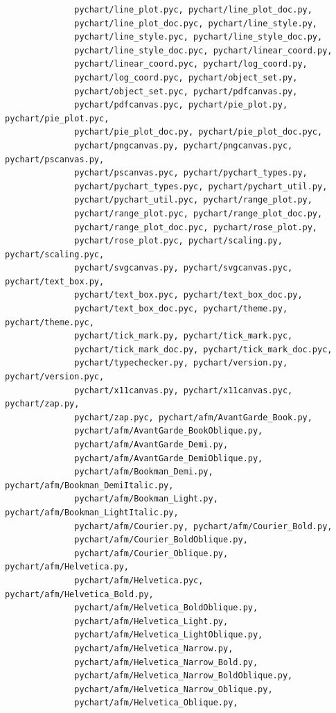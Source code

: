 \documentclass[a4paper]{article}
\begin{document}
\begin{verbatim}
              pychart/line_plot.pyc, pychart/line_plot_doc.py,
              pychart/line_plot_doc.pyc, pychart/line_style.py,
              pychart/line_style.pyc, pychart/line_style_doc.py,
              pychart/line_style_doc.pyc, pychart/linear_coord.py,
              pychart/linear_coord.pyc, pychart/log_coord.py,
              pychart/log_coord.pyc, pychart/object_set.py,
              pychart/object_set.pyc, pychart/pdfcanvas.py,
              pychart/pdfcanvas.pyc, pychart/pie_plot.py, pychart/pie_plot.pyc,
              pychart/pie_plot_doc.py, pychart/pie_plot_doc.pyc,
              pychart/pngcanvas.py, pychart/pngcanvas.pyc, pychart/pscanvas.py,
              pychart/pscanvas.pyc, pychart/pychart_types.py,
              pychart/pychart_types.pyc, pychart/pychart_util.py,
              pychart/pychart_util.pyc, pychart/range_plot.py,
              pychart/range_plot.pyc, pychart/range_plot_doc.py,
              pychart/range_plot_doc.pyc, pychart/rose_plot.py,
              pychart/rose_plot.pyc, pychart/scaling.py, pychart/scaling.pyc,
              pychart/svgcanvas.py, pychart/svgcanvas.pyc, pychart/text_box.py,
              pychart/text_box.pyc, pychart/text_box_doc.py,
              pychart/text_box_doc.pyc, pychart/theme.py, pychart/theme.pyc,
              pychart/tick_mark.py, pychart/tick_mark.pyc,
              pychart/tick_mark_doc.py, pychart/tick_mark_doc.pyc,
              pychart/typechecker.py, pychart/version.py, pychart/version.pyc,
              pychart/x11canvas.py, pychart/x11canvas.pyc, pychart/zap.py,
              pychart/zap.pyc, pychart/afm/AvantGarde_Book.py,
              pychart/afm/AvantGarde_BookOblique.py,
              pychart/afm/AvantGarde_Demi.py,
              pychart/afm/AvantGarde_DemiOblique.py,
              pychart/afm/Bookman_Demi.py, pychart/afm/Bookman_DemiItalic.py,
              pychart/afm/Bookman_Light.py, pychart/afm/Bookman_LightItalic.py,
              pychart/afm/Courier.py, pychart/afm/Courier_Bold.py,
              pychart/afm/Courier_BoldOblique.py,
              pychart/afm/Courier_Oblique.py, pychart/afm/Helvetica.py,
              pychart/afm/Helvetica.pyc, pychart/afm/Helvetica_Bold.py,
              pychart/afm/Helvetica_BoldOblique.py,
              pychart/afm/Helvetica_Light.py,
              pychart/afm/Helvetica_LightOblique.py,
              pychart/afm/Helvetica_Narrow.py,
              pychart/afm/Helvetica_Narrow_Bold.py,
              pychart/afm/Helvetica_Narrow_BoldOblique.py,
              pychart/afm/Helvetica_Narrow_Oblique.py,
              pychart/afm/Helvetica_Oblique.py,

\end{verbatim}
\end{document}
